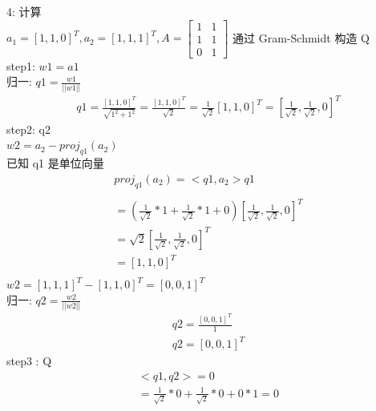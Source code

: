 \documentclass[12pt]{article}
\begin{document}
\begin{flushleft}
    4: 计算 \\
    $a_{1} = [1,1,0]^{T}, a_{2} = [1,1,1]^{T}, A = \begin{bmatrix}
            1 & 1 \\
            1 & 1 \\
            0 & 1
        \end{bmatrix}$
    通过 Gram-Schmidt 构造 Q \\
    step1: $w1 = a1$ \\
    归一:  $q1 = \frac{w1}{||w1||}$ \\
    \begin{align}
        q1 = \frac{[1,1,0]^{T}}{\sqrt{1^{2} + 1^{2}}}
        = \frac{[1,1,0]^{T}}{\sqrt{2}}
        = \frac{1}{\sqrt{2}}[1,1,0]^{T}
        = [\frac{1}{\sqrt{2}}, \frac{1}{\sqrt{2}}, 0]^{T}
    \end{align}
    step2: q2  \\
    $w2 = a_{2} - proj_{q1}(a_{2})$ \\
    已知 q1 是单位向量 \\
    \begin{align}
        proj_{q1}(a_{2}) = <q1,a_{2}>q1                                                                         \\                                                                         \\
        = (\frac{1}{\sqrt{2}} * 1 + \frac{1}{\sqrt{2}} * 1 + 0) [\frac{1}{\sqrt{2}}, \frac{1}{\sqrt{2}}, 0]^{T} \\
        = \sqrt{2} [\frac{1}{\sqrt{2}}, \frac{1}{\sqrt{2}}, 0]^{T}                                              \\
        = [1, 1, 0]^{T}                                                                                         \\
    \end{align}
    $w2 =  [1,1,1]^{T} - [1, 1, 0]^{T} = [0, 0, 1]^{T}$ \\
    归一: $q2 = \frac{w2}{||w2||}$ \\
    \begin{align}
        q2 = \frac{[0, 0, 1]^{T}}{1} \\
        q2 = [0, 0, 1]^{T}
    \end{align}
    step3 : Q \\
    \begin{align}
        <q1,q2> = 0                                                                     \\
        = \frac{1}{\sqrt{2}} * 0  + \frac{1}{\sqrt{2}} * 0 +  0 * 1 = 0                 \\                                                         \\

\end{align}
\end{flushleft}
\end{document}
